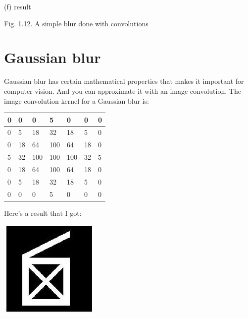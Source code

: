 \documentclass[10pt]{article}
\begin{document}
(f) result

Fig. 1.12. A simple blur done with convolutions

\section{Gaussian blur}
Gaussian blur has certain mathematical properties that makes it important for computer vision. And you can approximate it with an image convolution. The image convolution kernel for a Gaussian blur is:

\begin{tabular}{|l|l|l|l|l|l|l|}
\hline
0 & 0 & 0 & 5 & 0 & 0 & 0 \\
\hline
0 & 5 & 18 & 32 & 18 & 5 & 0 \\
\hline
0 & 18 & 64 & 100 & 64 & 18 & 0 \\
\hline
5 & 32 & 100 & 100 & 100 & 32 & 5 \\
\hline
0 & 18 & 64 & 100 & 64 & 18 & 0 \\
\hline
0 & 5 & 18 & 32 & 18 & 5 & 0 \\
\hline
0 & 0 & 0 & 5 & 0 & 0 & 0 \\
\hline
\end{tabular}

Here's a result that I got:

\includegraphics[max width=\textwidth]{2022_01_06_b5ce182ed1bd5f482e5bg-20}
\end{document}
